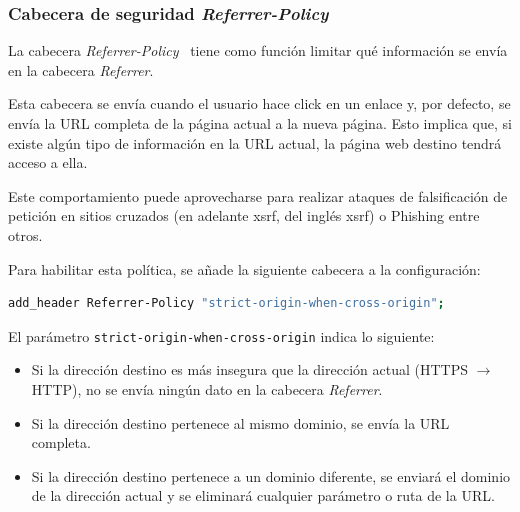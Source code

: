 \subsubsection{Cabecera de seguridad {\em Referrer-Policy}}
\par La cabecera {\em Referrer-Policy}~\cite{ReferrerPolicy} tiene como función limitar qué información se envía en la cabecera {\em Referrer}.
\par Esta cabecera se envía cuando el usuario hace click en un enlace y, por defecto, se envía la URL completa de la página actual a la nueva página. Esto implica que, si existe algún tipo de información en la URL actual, la
página web destino tendrá acceso a ella.
\par Este comportamiento puede aprovecharse para realizar ataques de falsificación de petición en sitios cruzados (en adelante \acrshort{xsrf}, del inglés \gls{xsrf}) o \gls{Phishing} entre otros.
\par Para habilitar esta política, se añade la siguiente cabecera a la configuración:
\begin{lstlisting}[language=bash]
add_header Referrer-Policy "strict-origin-when-cross-origin";
\end{lstlisting}
\par El parámetro \lstinline{strict-origin-when-cross-origin} indica lo siguiente:
\begin{itemize}
  \item Si la dirección destino es más insegura que la dirección actual (HTTPS $\rightarrow$ HTTP), no se envía ningún dato en la cabecera {\em Referrer}.
  \item Si la dirección destino pertenece al mismo dominio, se envía la URL completa.
  \item Si la dirección destino pertenece a un dominio diferente, se enviará el dominio de la dirección actual y se eliminará cualquier parámetro o ruta de la URL.
\end{itemize}

